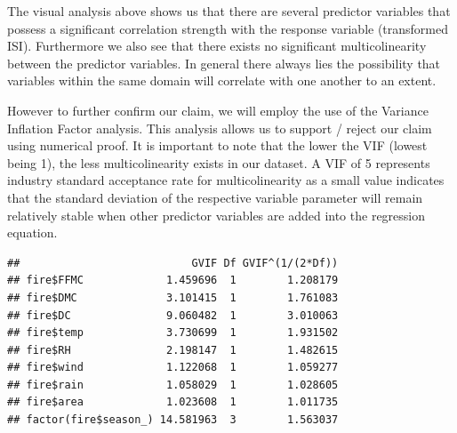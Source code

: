\documentclass[conference,final,]{IEEEtran}
\newenvironment{Shaded}{\begin{snugshade}}{\end{snugshade}}
\newcommand{\CommentTok}[1]{\textcolor[rgb]{0.56,0.35,0.01}{\textit{#1}}}
\newcommand{\DataTypeTok}[1]{\textcolor[rgb]{0.13,0.29,0.53}{#1}}
\newcommand{\KeywordTok}[1]{\textcolor[rgb]{0.13,0.29,0.53}{\textbf{#1}}}
\newcommand{\NormalTok}[1]{#1}
\newcommand{\OperatorTok}[1]{\textcolor[rgb]{0.81,0.36,0.00}{\textbf{#1}}}
\newcommand{\StringTok}[1]{\textcolor[rgb]{0.31,0.60,0.02}{#1}}
\begin{document}
The visual analysis above shows us that there are several predictor
variables that possess a significant correlation strength with the
response variable (transformed ISI). Furthermore we also see that there
exists no significant multicolinearity between the predictor variables.
In general there always lies the possibility that variables within the
same domain will correlate with one another to an extent.

However to further confirm our claim, we will employ the use of the
Variance Inflation Factor analysis. This analysis allows us to support /
reject our claim using numerical proof. It is important to note that the
lower the VIF (lowest being 1), the less multicolinearity exists in our
dataset. A VIF of 5 represents industry standard acceptance rate for
multicolinearity as a small value indicates that the standard deviation
of the respective variable parameter will remain relatively stable when
other predictor variables are added into the regression equation.

\begin{Shaded}
\end{Shaded}

\begin{verbatim}
##                           GVIF Df GVIF^(1/(2*Df))
## fire$FFMC             1.459696  1        1.208179
## fire$DMC              3.101415  1        1.761083
## fire$DC               9.060482  1        3.010063
## fire$temp             3.730699  1        1.931502
## fire$RH               2.198147  1        1.482615
## fire$wind             1.122068  1        1.059277
## fire$rain             1.058029  1        1.028605
## fire$area             1.023608  1        1.011735
## factor(fire$season_) 14.581963  3        1.563037
\end{verbatim}
\end{document}
